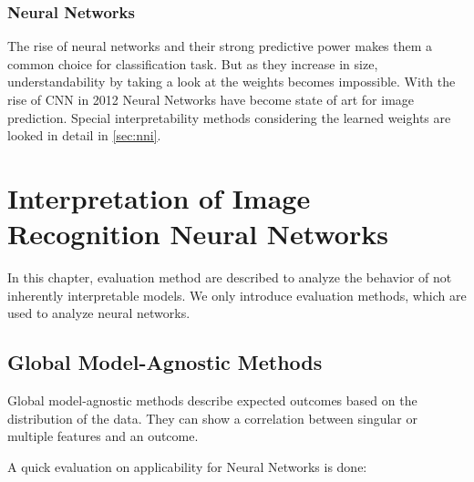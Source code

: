 
\subsection{Neural Networks}

The rise of neural networks and their strong predictive power makes them a common choice for classification task. But as they increase in size, understandability by taking a look at the weights becomes impossible. With the rise of CNN in 2012  \cite{krizhevsky2012nn} Neural Networks have become state of art for image prediction. Special interpretability methods considering the learned weights are looked in detail in \ref{sec:nni}.


\chapter{Interpretation of Image Recognition Neural Networks}

In this chapter, evaluation method are described to analyze the behavior of not inherently interpretable models. We only introduce evaluation methods, which are used to analyze neural networks.

\section{Global Model-Agnostic Methods}

Global model-agnostic methods describe expected outcomes based on the distribution of the data. They can show a correlation between singular or multiple features and an outcome.

A quick evaluation on applicability for Neural Networks is done:

